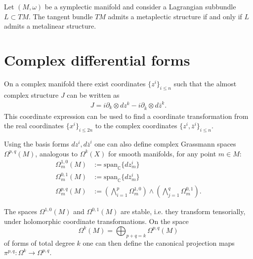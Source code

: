     \begin{property}\label{complex:metaplectic}
        Let $(M,\omega)$ be a symplectic manifold and consider a Lagrangian subbundle $L\subset TM$. The tangent bundle $TM$ admits a metaplectic structure if and only if $L$ admits a metalinear structure.
    \end{property}

\section{Complex differential forms}

    \begin{property}
        On a complex manifold there exist coordinates $\{z^i\}_{i\leq n}$ such that the almost complex structure $J$ can be written as
        \begin{gather}
            \label{complex:complex_structure}
            J = i\partial_k\otimes dz^k - i\partial_{\overline{k}}\otimes d\overline{z}^k.
        \end{gather}
        This coordinate expression can be used to find a coordinate transformation from the real coordinates $\{x^i\}_{i\leq2n}$ to the complex coordinates $\{z^i, \overline{z}^i\}_{i\leq n}$.
    \end{property}

    Using the basis forms $dz^i,d\overline{z}^i$ one can also define complex Grassmann spaces $\Omega^{p,q}(M)$, analogous to $\Omega^k(X)$ for smooth manifolds, for any point $m\in M$:
    \begin{align}
        \Omega^{1,0}_m(M) &:= \text{span}_{\mathbb{C}}\{dz^i_m\}\\
        \Omega^{0,1}_m(M) &:= \text{span}_{\mathbb{C}}\{d\overline{z}^i_m\}\\
        \Omega^{p,q}_m(M) &:= \left(\bigwedge_{i=1}^p\Omega^{1, 0}_m\right)\wedge\left(\bigwedge_{j=1}^q\Omega^{0, 1}_m\right).
    \end{align}

    \begin{property}
        The spaces $\Omega^{1,0}(M)$ and $\Omega^{0,1}(M)$ are stable, i.e. they transform tensorially, under holomorphic coordinate transformations. On the space \[\Omega^k(M) = \bigoplus_{p+q=k}\Omega^{p,q}(M)\] of forms of total degree $k$ one can then define the canonical projection maps $\pi^{p,q}:\Omega^k\rightarrow\Omega^{p,q}$.
    \end{property}

